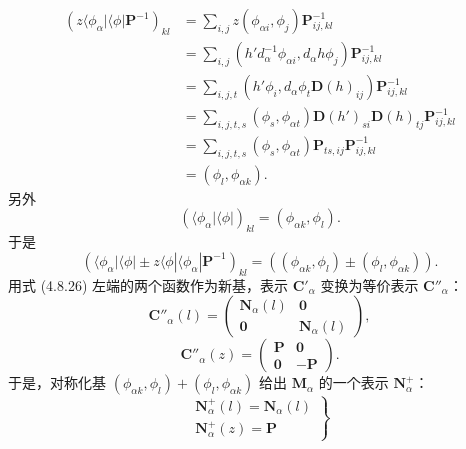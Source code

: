 \begin{equation*}
\begin{array}{rl}
\left(z\langle \phi_{\alpha}|\langle \phi |\mathbf{P}^{-1}\right)_{kl} &= \sum_{i, j}z(\phi_{\alpha i}, \phi_{j})\mathbf{P}^{-1}_{ij, kl}\\
&= \sum_{i, j}(h'd^{-1}_{\alpha}\phi_{\alpha i}, d_{\alpha}h\phi_{j})\mathbf{P}^{-1}_{ij, kl}\\
&= \sum_{i, j, t}(h'\phi_{i}, d_{\alpha}\phi_{t}\mathbf{D}(h)_{ij})\mathbf{P}^{-1}_{ij, kl}\\
&= \sum_{i, j, t, s}(\phi_{s}, \phi_{\alpha t})\mathbf{D}(h')_{si}\mathbf{D}(h)_{tj}\mathbf{P}^{-1}_{ij, kl}\\
&= \sum_{i, j, t, s}(\phi_{s}, \phi_{\alpha t})\mathbf{P}_{ts, ij}\mathbf{P}^{-1}_{ij, kl}\\
&= (\phi_{l}, \phi_{\alpha k}).
\end{array}
\tag{4.8.24}
\end{equation*}
另外
\begin{equation*}
\left(\langle \phi_{\alpha}|\langle \phi |\right)_{kl} = (\phi_{\alpha k}, \phi_{l}).
\tag{4.8.25}
\end{equation*}
于是
\begin{equation*}
\left(\langle \phi_{\alpha}|\langle \phi | \pm z\langle \phi|\langle \phi_{\alpha}|\mathbf{P}^{-1}\right)_{kl} = \left((\phi_{\alpha k}, \phi_{l}) \pm (\phi_{l}, \phi_{\alpha k})\right).
\tag{4.8.26}
\end{equation*}
用式 (4.8.26) 左端的两个函数作为新基，表示 $\mathbf{C}'_{\alpha}$ 变换为等价表示 $\mathbf{C}''_{\alpha}$：
\begin{equation*}
\mathbf{C}''_{\alpha}(l) = \begin{pmatrix} \mathbf{N}_{\alpha}(l) & \mathbf{0}\\ \mathbf{0} & \mathbf{N}_{\alpha}(l) \end{pmatrix},
\tag{4.8.27}
\end{equation*}
\begin{equation*}
\mathbf{C}''_{\alpha}(z) = \begin{pmatrix} \mathbf{P} & \mathbf{0}\\ \mathbf{0} & -\mathbf{P} \end{pmatrix}.
\tag{4.8.28}
\end{equation*}
于是，对称化基 $(\phi_{\alpha k}, \phi_{l}) + (\phi_{l}, \phi_{\alpha k})$ 给出 $\mathbf{M}_{\alpha}$ 的一个表示 $\mathbf{N}^{+}_{\alpha}$：
\begin{equation*}
\left.
\begin{array}{l}
\mathbf{N}^{+}_{\alpha}(l) = \mathbf{N}_{\alpha}(l)\\
\mathbf{N}^{+}_{\alpha}(z) = \mathbf{P}
\end{array}
\right\}
\tag{4.8.29}
\end{equation*}
